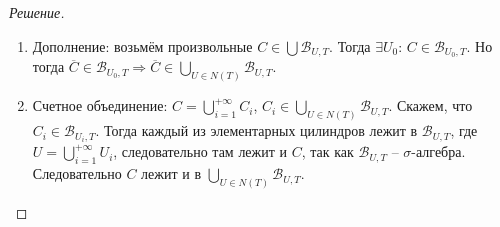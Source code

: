 \documentclass[12pt,a4paper]{extarticle}
\newcommand{\B}{\mathcal{B}}
\begin{document}
\begin{proof}[Решение]
\begin{itemize}
\begin{enumerate}
			\item Дополнение: возьмём произвольные $C \in \bigcup \B_{U,T}$. Тогда $\exists U_0$: $C \in \B_{U_0,T}$. Но тогда $\overline{C} \in \B_{U_0,T} \Rightarrow \overline{C} \in \bigcup_{U \in N(T)} \B_{U,T}$.
			
			\item Счетное объединение: $C = \bigcup_{i=1}^{+\infty} C_i$, $C_i \in \bigcup_{U \in N(T)} \B_{U,T}$. Скажем, что $C_i \in \B_{U_i,T}$. Тогда каждый из элементарных цилиндров лежит в $\B_{U,T}$, где $U = \bigcup_{i=1}^{+\infty} U_i$, следовательно там лежит и $C$, так как $\B_{U,T}$ -- $\sigma$-алгебра. Следовательно $C$ лежит и в $\bigcup_{U \in N(T)} \B_{U,T}$.
			
		\end{enumerate}
		
	\end{itemize}
	
	
	
	
	
	
	

\end{proof}






\vspace{\baselineskip}
\end{document}

